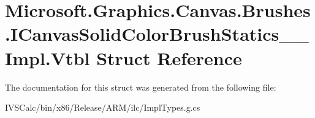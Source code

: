 \hypertarget{struct_microsoft_1_1_graphics_1_1_canvas_1_1_brushes_1_1_i_canvas_solid_color_brush_statics_____impl_1_1_vtbl}{}\section{Microsoft.\+Graphics.\+Canvas.\+Brushes.\+I\+Canvas\+Solid\+Color\+Brush\+Statics\+\_\+\+\_\+\+Impl.\+Vtbl Struct Reference}
\label{struct_microsoft_1_1_graphics_1_1_canvas_1_1_brushes_1_1_i_canvas_solid_color_brush_statics_____impl_1_1_vtbl}


The documentation for this struct was generated from the following file\+:\begin{DoxyCompactItemize}
\item 
I\+V\+S\+Calc/bin/x86/\+Release/\+A\+R\+M/ilc/Impl\+Types.\+g.\+cs\end{DoxyCompactItemize}
